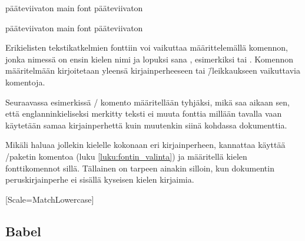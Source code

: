 \begin{koodilohkosis}
  \sffamily
  pääteviivaton \textenglish{main font} pääteviivaton
\end{koodilohkosis}

\begin{tulossis}
  \sffamily pääteviivaton {\rmfamily main font} pääteviivaton
\end{tulossis}

Erikielisten tekstikatkelmien fonttiin voi vaikuttaa määrittelemällä
komennon, jonka nimessä on ensin kielen nimi ja lopuksi sana
, esimerkiksi  tai .
Komennon määritelmään kirjoitetaan yleensä kirjainperheeseen tai
\=/leikkaukseen vaikuttavia komentoja.

Seuraavassa esimerkissä \-/ komento määritellään
tyhjäksi, mikä saa aikaan sen, että englanninkieliseksi merkitty teksti
ei muuta fonttia millään tavalla vaan käytetään samaa kirjainperhettä
kuin muutenkin siinä kohdassa dokumenttia.

\begin{koodilohkosis}
  \newcommand{\englishfont}{}
\end{koodilohkosis}

Mikäli haluaa jollekin kielelle kokonaan eri kirjainperheen, kannattaa
käyttää \-/paketin komentoa 
(luku \ref{luku:fontin_valinta}) ja määritellä kielen fonttikomennot
sillä. Tällainen on tarpeen ainakin silloin, kun dokumentin
peruskirjainperhe ei sisällä kyseisen kielen kirjaimia.

\begin{koodilohkosis}
  [Scale=MatchLowercase]
\end{koodilohkosis}


%


\subsection{Babel}

